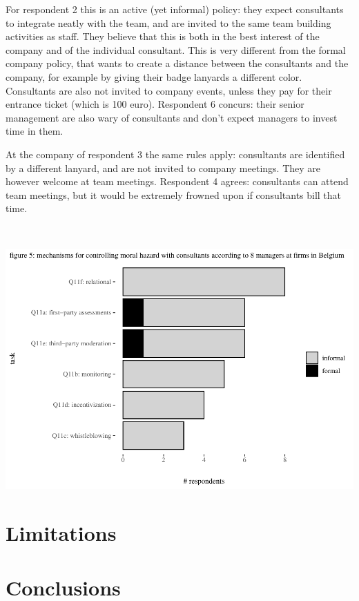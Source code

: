 \documentclass[12pt]{article}
\begin{document}
For respondent 2 this is an active (yet informal) policy: they expect
consultants to integrate neatly with the team, and are invited to the
same team building activities as staff. They believe that this is both
in the best interest of the company and of the individual consultant.
This is very different from the formal company policy, that wants to
create a distance between the consultants and the company, for example
by giving their badge lanyards a different color. Consultants are also
not invited to company events, unless they pay for their entrance ticket
(which is 100 euro). Respondent 6 concurs: their senior management are
also wary of consultants and don't expect managers to invest time in
them.

At the company of respondent 3 the same rules apply: consultants are
identified by a different lanyard, and are not invited to company
meetings. They are however welcome at team meetings. Respondent 4
agrees: consultants can attend team meetings, but it would be extremely
frowned upon if consultants bill that time.

\(~\)

\begin{center}\includegraphics[width=0.75\linewidth]{2_ams_five_pager_files/figure-latex/unnamed-chunk-7-1} \end{center}

\section{Limitations}\label{limitations}

\section{Conclusions}\label{conclusions}


\renewcommand\refname{References}

\end{document}
